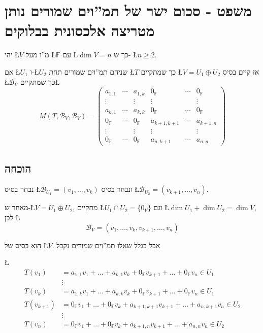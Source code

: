 \documentclass[english,hebrew]{article}
\begin{document}
\section{משפט - סכום ישר של תמ\textquotedblright וים שמורים נותן מטריצה אלכסונית
בבלוקים}

יהי \L{$V$} מ\textquotedblright ו מעל \L{$\mathbb{F}$} עם \L{$\dim V=n$}
כך ש- \L{$n\geq2$}.

אם \L{$U_{1}$} ו-\L{$U_{2}$} שניהם תמ\textquotedblright וים שמורים
תחת \L{$T$} כך שמתקיים \L{$V=U_{1}\oplus U_{2}$} אז קיים בסיס \L{$\mathcal{B}_{V}$}
כך שמתקיים\L{%
\[
M(T,\mathcal{B}_{V},\mathcal{B}_{V})=\left(\begin{array}{ccc|ccc}
a_{1,1} & \cdots & a_{1,k} & 0_{\mathbb{F}} & \cdots & 0_{\mathbb{F}}\\
\vdots &  & \vdots & \vdots &  & \vdots\\
a_{k,1} & \cdots & a_{k,k} & 0_{\mathbb{F}} & \cdots & 0_{\mathbb{F}}\\
\hline 0_{\mathbb{F}} & \cdots & 0_{\mathbb{F}} & a_{k+1,k+1} & \cdots & a_{k+1,n}\\
\vdots &  & \vdots & \vdots &  & \vdots\\
0_{\mathbb{F}} & \cdots & 0_{\mathbb{F}} & a_{n,k+1} & \cdots & a_{n,n}
\end{array}\right)
\]
}%

\subsection{הוכחה}

נבחר בסיס \L{$\mathcal{B}_{U_{1}}=(v_{1},\dots,v_{k})$} ונבחר בסיס
\L{$\mathcal{B}_{U_{2}}=(v_{k+1},\dots,v_{n})$}.

מאחר ש-\L{$V=U_{1}\oplus U_{2}$}, מתקיים \L{$U_{1}\cap U_{2}=\{0_{V}\}$}
וגם \L{$\dim U_{1}+\dim U_{2}=\dim V$}, לכן \L{%
\[
\mathcal{B}_{V}=(v_{1},\dots,v_{k},v_{k+1},\dots,v_{n})
\]
}%

הוא בסיס של \L{$V$}. אבל בגלל שאלו תמ\textquotedblright וים שמורים
נקבל

\L{%
\begin{align*}
T(v_{1}) & =a_{1,1}v_{1}+\dots+a_{k,1}v_{k}+0_{\mathbb{F}}v_{k+1}+\dots+0_{\mathbb{F}}v_{n}\in U_{1}\\
 & \vdots\\
T(v_{k}) & =a_{1,k}v_{1}+\dots+a_{k,k}v_{k}+0_{\mathbb{F}}v_{k+1}+\dots+0_{\mathbb{F}}v_{n}\in U_{1}\\
T(v_{k+1}) & =0_{\mathbb{F}}v_{1}+\dots+0_{\mathbb{F}}v_{k}+a_{k+1,k+1}v_{k+1}+\dots+a_{n,k+1}v_{n}\in U_{2}\\
 & \vdots\\
T(v_{n}) & =0_{\mathbb{F}}v_{1}+\dots+0_{\mathbb{F}}v_{k}+a_{k+1,n}v_{k+1}+\dots+a_{n,n}v_{n}\in U_{2}
\end{align*}
}%
\end{document}
